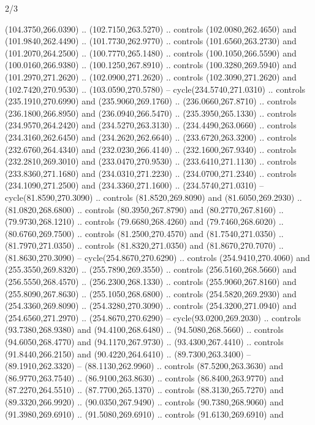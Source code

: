 \begin{flagdescription}{2/3}
\begin{scope}[xshift=0.5\flaglength,yshift=0.5\flagwidth,scale=\stretchfactor]
\begin{scope}[scale=0.001645\flagwidth,yshift=65mm,xshift=-63mm]
\begin{scope}[y=0.80pt, x=0.80pt, yscale=-1,]
\begin{scope}[cm={{1.33333,0.0,0.0,1.33333,(0.0,1e-05)}}]
  (104.3750,266.0390) .. (102.7150,263.5270) .. controls (102.0080,262.4650) and
  (101.9840,262.4490) .. (101.7730,262.9770) .. controls (101.6560,263.2730) and
  (101.2070,264.2500) .. (100.7770,265.1480) .. controls (100.1050,266.5590) and
  (100.0160,266.9380) .. (100.1250,267.8910) .. controls (100.3280,269.5940) and
  (101.2970,271.2620) .. (102.0900,271.2620) .. controls (102.3090,271.2620) and
  (102.7420,270.9530) .. (103.0590,270.5780) -- cycle(234.5740,271.0310) ..
  controls (235.1910,270.6990) and (235.9060,269.1760) .. (236.0660,267.8710) ..
  controls (236.1800,266.8950) and (236.0940,266.5470) .. (235.3950,265.1330) ..
  controls (234.9570,264.2420) and (234.5270,263.3130) .. (234.4490,263.0660) ..
  controls (234.3160,262.6450) and (234.2620,262.6640) .. (233.6720,263.3200) ..
  controls (232.6760,264.4340) and (232.0230,266.4140) .. (232.1600,267.9340) ..
  controls (232.2810,269.3010) and (233.0470,270.9530) .. (233.6410,271.1130) ..
  controls (233.8360,271.1680) and (234.0310,271.2230) .. (234.0700,271.2340) ..
  controls (234.1090,271.2500) and (234.3360,271.1600) .. (234.5740,271.0310) --
  cycle(81.8590,270.3090) .. controls (81.8520,269.8090) and (81.6050,269.2930)
  .. (81.0820,268.6800) .. controls (80.3950,267.8790) and (80.2770,267.8160) ..
  (79.9730,268.1210) .. controls (79.6680,268.4260) and (79.7460,268.6020) ..
  (80.6760,269.7500) .. controls (81.2500,270.4570) and (81.7540,271.0350) ..
  (81.7970,271.0350) .. controls (81.8320,271.0350) and (81.8670,270.7070) ..
  (81.8630,270.3090) -- cycle(254.8670,270.6290) .. controls (254.9410,270.4060)
  and (255.3550,269.8320) .. (255.7890,269.3550) .. controls (256.5160,268.5660)
  and (256.5550,268.4570) .. (256.2300,268.1330) .. controls (255.9060,267.8160)
  and (255.8090,267.8630) .. (255.1050,268.6800) .. controls (254.5820,269.2930)
  and (254.3360,269.8090) .. (254.3280,270.3090) .. controls (254.3200,271.0940)
  and (254.6560,271.2970) .. (254.8670,270.6290) -- cycle(93.0200,269.2030) ..
  controls (93.7380,268.9380) and (94.4100,268.6480) .. (94.5080,268.5660) ..
  controls (94.6050,268.4770) and (94.1170,267.9730) .. (93.4300,267.4410) ..
  controls (91.8440,266.2150) and (90.4220,264.6410) .. (89.7300,263.3400) --
  (89.1910,262.3320) -- (88.1130,262.9960) .. controls (87.5200,263.3630) and
  (86.9770,263.7540) .. (86.9100,263.8630) .. controls (86.8400,263.9770) and
  (87.2270,264.5510) .. (87.7700,265.1370) .. controls (88.3130,265.7270) and
  (89.3320,266.9920) .. (90.0350,267.9490) .. controls (90.7380,268.9060) and
  (91.3980,269.6910) .. (91.5080,269.6910) .. controls (91.6130,269.6910) and

\end{scope}
\end{scope}
\end{scope}
\end{scope}
\end{flagdescription}
